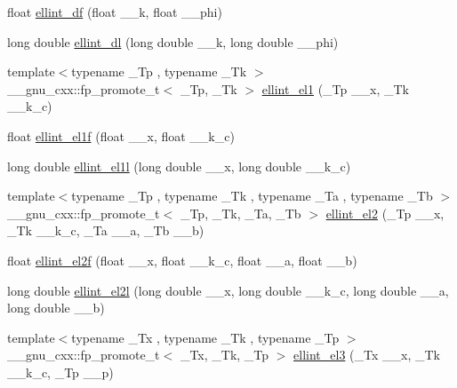 \begin{DoxyCompactItemize}
\item 
float \hyperlink{group__gnu__math__spec__func_ga02ed50be21fdd84ad6bed003f94a9e69}{ellint\+\_\+df} (float \+\_\+\+\_\+k, float \+\_\+\+\_\+phi)
\item 
long double \hyperlink{group__gnu__math__spec__func_gaa34bcb8e316f2e8b2b2bf48cd89abd98}{ellint\+\_\+dl} (long double \+\_\+\+\_\+k, long double \+\_\+\+\_\+phi)
\item 
{\footnotesize template$<$typename \+\_\+\+Tp , typename \+\_\+\+Tk $>$ }\\\+\_\+\+\_\+gnu\+\_\+cxx\+::fp\+\_\+promote\+\_\+t$<$ \+\_\+\+Tp, \+\_\+\+Tk $>$ \hyperlink{group__gnu__math__spec__func_ga510b1e51e7d3bc937ed1b4c2f57492e4}{ellint\+\_\+el1} (\+\_\+\+Tp \+\_\+\+\_\+x, \+\_\+\+Tk \+\_\+\+\_\+k\+\_\+c)
\item 
float \hyperlink{group__gnu__math__spec__func_ga8d8342bb4f42c7fe09b5589c54d4e713}{ellint\+\_\+el1f} (float \+\_\+\+\_\+x, float \+\_\+\+\_\+k\+\_\+c)
\item 
long double \hyperlink{group__gnu__math__spec__func_gaeed1201e421be410460739048cba5cd8}{ellint\+\_\+el1l} (long double \+\_\+\+\_\+x, long double \+\_\+\+\_\+k\+\_\+c)
\item 
{\footnotesize template$<$typename \+\_\+\+Tp , typename \+\_\+\+Tk , typename \+\_\+\+Ta , typename \+\_\+\+Tb $>$ }\\\+\_\+\+\_\+gnu\+\_\+cxx\+::fp\+\_\+promote\+\_\+t$<$ \+\_\+\+Tp, \+\_\+\+Tk, \+\_\+\+Ta, \+\_\+\+Tb $>$ \hyperlink{group__gnu__math__spec__func_ga6230131ce5679e0936a16a6b029d6342}{ellint\+\_\+el2} (\+\_\+\+Tp \+\_\+\+\_\+x, \+\_\+\+Tk \+\_\+\+\_\+k\+\_\+c, \+\_\+\+Ta \+\_\+\+\_\+a, \+\_\+\+Tb \+\_\+\+\_\+b)
\item 
float \hyperlink{group__gnu__math__spec__func_ga0bf7469fe7ac92e9a2ffa0f92ea62248}{ellint\+\_\+el2f} (float \+\_\+\+\_\+x, float \+\_\+\+\_\+k\+\_\+c, float \+\_\+\+\_\+a, float \+\_\+\+\_\+b)
\item 
long double \hyperlink{group__gnu__math__spec__func_ga491439a09e6000659444f52dc3c9f215}{ellint\+\_\+el2l} (long double \+\_\+\+\_\+x, long double \+\_\+\+\_\+k\+\_\+c, long double \+\_\+\+\_\+a, long double \+\_\+\+\_\+b)
\item 
{\footnotesize template$<$typename \+\_\+\+Tx , typename \+\_\+\+Tk , typename \+\_\+\+Tp $>$ }\\\+\_\+\+\_\+gnu\+\_\+cxx\+::fp\+\_\+promote\+\_\+t$<$ \+\_\+\+Tx, \+\_\+\+Tk, \+\_\+\+Tp $>$ \hyperlink{group__gnu__math__spec__func_gaac07922e08fdf46cd509ff0cfa9ea1f0}{ellint\+\_\+el3} (\+\_\+\+Tx \+\_\+\+\_\+x, \+\_\+\+Tk \+\_\+\+\_\+k\+\_\+c, \+\_\+\+Tp \+\_\+\+\_\+p)

\end{DoxyCompactItemize}
